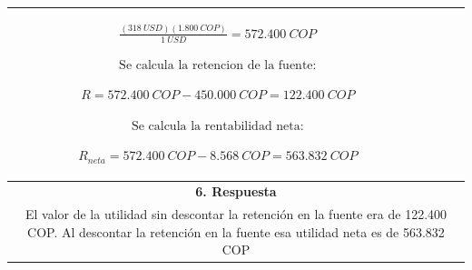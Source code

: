 \begin{center}
\begin{longtable}[H]{|c|c|c|}
{\begin{center}
  		$ \frac{(318 \ USD) (1{.}800 \ COP)}{ 1 \ USD} =  572{.}400 \ COP$\newline
  		
  	\end{center}
  	$\text{Se calcula la retencion de la fuente:}$\newline
  	\begin{center}
  		$R =  572{.}400 \ COP - 450{.}000 \ COP =  122{.}400 \ COP$\newline
  	\end{center}
  	$\text{Se calcula la rentabilidad neta:}$\newline
  	\begin{center}
  		$R_{neta} =  572{.}400 \ COP - 8{.}568 \ COP =  563{.}832 \ COP$\newline
  	\end{center}
}
                                                                                                                    \\ \hline
\multicolumn{3}{|c|}{\cellcolor[HTML]{FFB183}\textbf{6. Respuesta}}                                         \\ \hline
\multicolumn{3}{|p{\textwidth}|}{El valor de la utilidad sin descontar la retención en la fuente era de 122.400 COP. Al descontar la retención en la fuente esa utilidad neta es de
563.832 COP}  \\ \hline




 \end{longtable}
\end{center}